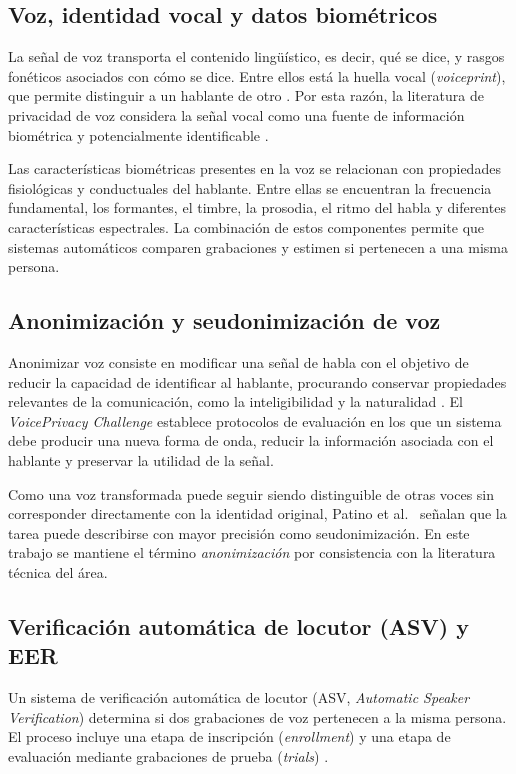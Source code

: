 \documentclass[10pt,twocolumn]{article}
\begin{document}
\subsection{Voz, identidad vocal y datos biométricos}

La señal de voz transporta el contenido lingüístico, es decir, qué se dice, y
rasgos fonéticos asociados con cómo se dice. Entre ellos está la huella vocal
(\textit{voiceprint}), que permite distinguir a un hablante de otro
\cite{deng2023}. Por esta razón, la literatura de privacidad de voz considera
la señal vocal como una fuente de información biométrica y potencialmente
identificable \cite{patino2021}.

Las características biométricas presentes en la voz se relacionan con
propiedades fisiológicas y conductuales del hablante. Entre ellas se encuentran
la frecuencia fundamental, los formantes, el timbre, la prosodia, el ritmo del
habla y diferentes características espectrales. La combinación de estos
componentes permite que sistemas automáticos comparen grabaciones y estimen si
pertenecen a una misma persona.

\subsection{Anonimización y seudonimización de voz}

Anonimizar voz consiste en modificar una señal de habla con el objetivo de
reducir la capacidad de identificar al hablante, procurando conservar
propiedades relevantes de la comunicación, como la inteligibilidad y la
naturalidad \cite{patino2021}. El \textit{VoicePrivacy Challenge} establece
protocolos de evaluación en los que un sistema debe producir una nueva forma de
onda, reducir la información asociada con el hablante y preservar la utilidad
de la señal.

Como una voz transformada puede seguir siendo distinguible de otras voces sin
corresponder directamente con la identidad original, Patino et
al.~\cite{patino2021} señalan que la tarea puede describirse con mayor precisión
como seudonimización. En este trabajo se mantiene el término
\textit{anonimización} por consistencia con la literatura técnica del área.

\subsection{Verificación automática de locutor (ASV) y EER}

Un sistema de verificación automática de locutor (ASV,
\textit{Automatic Speaker Verification}) determina si dos grabaciones de voz
pertenecen a la misma persona. El proceso incluye una etapa de inscripción
(\textit{enrollment}) y una etapa de evaluación mediante grabaciones de prueba
(\textit{trials}) \cite{deng2023}.
\end{document}
